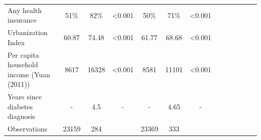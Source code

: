 \begin{landscape}
\begin{table}[p]
\begin{center}
\begin{adjustbox}{max width=\linewidth}
{\begin{tabular}{l*{6}{SS}}
Any health insurance&        51\%&     82\%&     <0.001       &        50\%&        71\%&       <0.001      \\
Urbanization Index  &       60.87&     74.48&     <0.001       &       61.77&       68.68&     <0.001       \\
Per capita household income (Yuan (2011))&    8617&     16328&    <0.001        &     8581&     11101&    <0.001        \\
Years since diabetes diagnosis&       -&        4.5&      -      &        -&        4.65&      -      \\
\midrule
Observations        &       23159&         284&       &        23369&         333&            \\
\bottomrule
\end{tabular}
}
\end{adjustbox}
\end{center}
\end{table}
\end{landscape}


